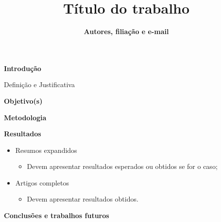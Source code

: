 \documentclass[18pt]{beamer}
\title[]{
{\fontsize{28pt}{30}\selectfont\textbf{Título do trabalho}}}
\author{
{\fontsize{18pt}{20}\selectfont \textbf{
Autores, filiação e e-mail
}}}
\begin{document}
{\logotitle
\begin{frame}
\maketitle
\end{frame}
}



\begin{frame}{\fontsize{20pt}{20}\selectfont \textbf{Introdução}}

Definição e Justificativa

\end{frame}



\begin{frame}{\fontsize{20pt}{20}\selectfont \textbf{Objetivo(s)}}



\end{frame}


\begin{frame}{\fontsize{20pt}{20}\selectfont \textbf{Metodologia}}



\end{frame}


\begin{frame}{\fontsize{20pt}{20}\selectfont \textbf{Resultados}}

\begin{itemize}
    \item Resumos expandidos
    \begin{itemize}
        \item Devem apresentar resultados esperados ou obtidos se for o caso;
    \end{itemize}
    \item Artigos completos
    \begin{itemize}
        \item Devem apresentar resultados obtidos.
    \end{itemize}
\end{itemize}

\end{frame}


\begin{frame}{\fontsize{20pt}{20}\selectfont \textbf{Conclusões e trabalhos futuros}}



\end{frame}
\end{document}
